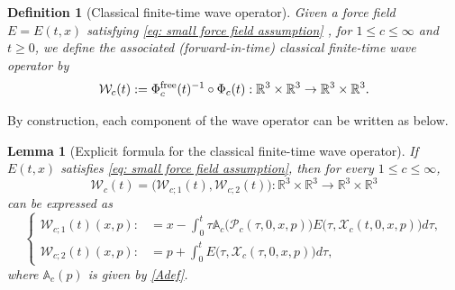 \documentclass[reqno, 11pt, letterpaper]{amsart}
\newtheorem{definition}[theorem]{Definition}
\newtheorem{lemma}[theorem]{Lemma}
\theoremstyle{remark}
\numberwithin{equation}{section}
\numberwithin{theorem}{section}
\numberwithin{table}{section}
\numberwithin{figure}{section}
\begin{document}
\begin{definition}[Classical finite-time wave operator]\label{def: classical finite-time wave operator}
Given a force field $E=E(t,x)$ satisfying \eqref{eq: small force field assumption} , for $1\leq c\leq\infty$ and $t\geq0$, we define the associated (forward-in-time) \textit{classical finite-time wave operator} by 
\begin{equation}\label{eq: classical finite time wave operator}
\mathcal{W}_c(t):=\Phi_c^{\textup{free}}(t)^{-1}\circ\Phi_c(t): \mathbb{R}^3\times \mathbb{R}^3\to\mathbb{R}^3\times \mathbb{R}^3.
\end{equation}
\end{definition}

By construction, each component of the wave operator can be written as below.

\begin{lemma}[Explicit formula for the classical finite-time wave operator]\label{lemma: explicit formula for the classical finite-time wave operator}
If $E(t,x)$ satisfies \eqref{eq: small force field assumption}, then for every $1 \leq c \leq \infty$, $$\mathcal{W}_c(t)=\big(\mathcal{W}_{c;1}(t),\mathcal{W}_{c;2}(t)\big):\mathbb{R}^3\times \mathbb{R}^3\to\mathbb{R}^3\times \mathbb{R}^3$$
can be expressed as
\begin{equation}\label{eq: explicit representation of the finite-time wave operator-2}
\left\{\begin{aligned}
\mathcal{W}_{c;1}(t)(x,p):&=x-\int_0^t \tau\mathbb{A}_c\big(\mathcal{P}_c(\tau,0,x,p)\big)E\big(\tau,\mathcal{X}_c(t,0,x,p)\big) d\tau,\\
\mathcal{W}_{c;2}(t)(x,p):&=p+\int_0^tE\big(\tau,\mathcal{X}_c(\tau,0,x,p)\big)d\tau,
\end{aligned}\right.
\end{equation}
where $\mathbb{A}_c(p)$ is given by \eqref{Adef}.
\end{lemma}
\end{document}
